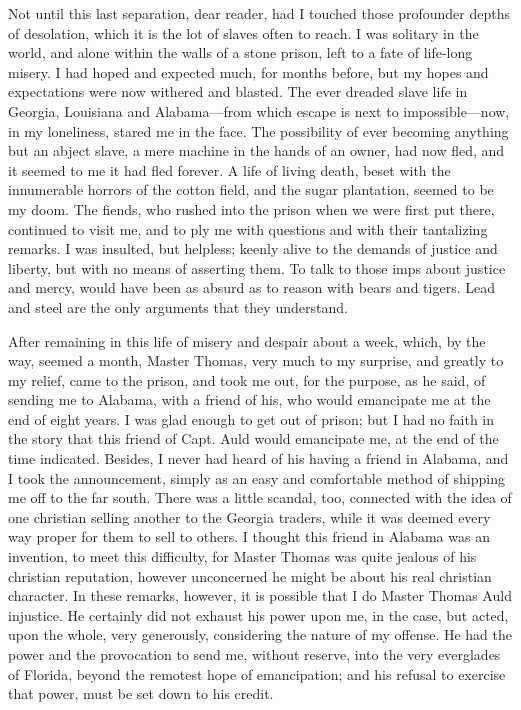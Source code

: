 Not until this last separation, dear reader, had I touched those
profounder depths of desolation, which it is the lot of slaves often to
reach. I was solitary in the world, and alone within the walls of a
stone prison, left to a fate of life-long misery. I had hoped and
expected much, for months before, but my hopes and expectations were now
withered and blasted. The ever dreaded slave life in Georgia, Louisiana
and Alabama---from which escape is next to impossible---now, in my
loneliness, stared me in the face. The possibility of ever becoming
anything but an abject slave, a mere machine in the hands of an owner,
had now fled, and it seemed to me it had fled forever. A life of living
death, beset with the innumerable {}horrors of the cotton field, and the
sugar plantation, seemed to be my doom. The fiends, who rushed into the
prison when we were first put there, continued to visit me, and to ply
me with questions and with their tantalizing remarks. I was insulted,
but helpless; keenly alive to the demands of justice and liberty, but
with no means of asserting them. To talk to those imps about justice and
mercy, would have been as absurd as to reason with bears and tigers.
Lead and steel are the only arguments that they understand.

After remaining in this life of misery and despair about a week, which,
by the way, seemed a month, Master Thomas, very much to my surprise, and
greatly to my relief, came to the prison, and took me out, for the
purpose, as he said, of sending me to Alabama, with a friend of his, who
would emancipate me at the end of eight years. I was glad enough to get
out of prison; but I had no faith in the story that this friend of Capt.
Auld would emancipate me, at the end of the time indicated. Besides, I
never had heard of his having a friend in Alabama, and I took the
announcement, simply as an easy and comfortable method of shipping me
off to the far south. There was a little scandal, too, connected with
the idea of one christian selling another to the Georgia traders, while
it was deemed every way proper for them to sell to others. I thought
this friend in Alabama was an invention, to meet this difficulty, for
Master Thomas was quite jealous of his christian reputation, however
unconcerned he might be about his real christian character. In these
remarks, however, it is possible that I do {}Master Thomas Auld
injustice. He certainly did not exhaust his power upon me, in the case,
but acted, upon the whole, very generously, considering the nature of my
offense. He had the power and the provocation to send me, without
reserve, into the very everglades of Florida, beyond the remotest hope
of emancipation; and his refusal to exercise that power, must be set
down to his credit.

